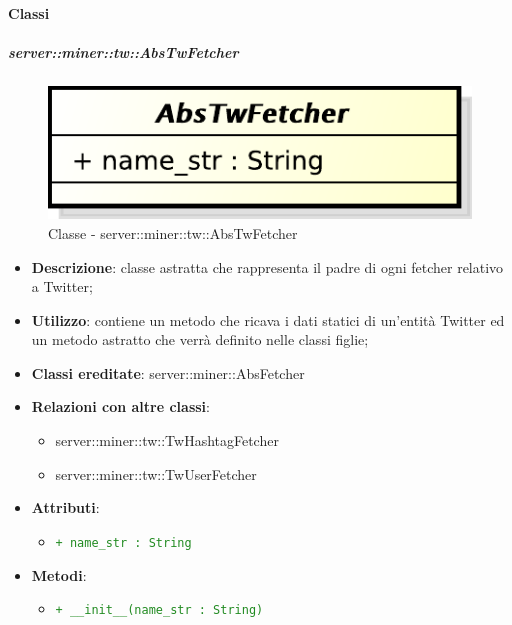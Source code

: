 	\paragraph{Classi} %
	\subparagraph{server::miner::tw::AbsTwFetcher} %
		\label{subp:server_miner_tw_AbsTwFetcher}
		    \begin{figure}[!htbp]
 		 		\centering
 				\centerline{\includegraphics[scale=0.75]{./images/server/classes/miner/abs_tw_fetcher.pdf}}
 				\caption{Classe - server::miner::tw::AbsTwFetcher}
			\end{figure}
			\begin{itemize}
				\item \textbf{Descrizione}: classe astratta che rappresenta il padre di ogni fetcher relativo a Twitter;
				\item \textbf{Utilizzo}: contiene un metodo che ricava i dati statici di un'entità Twitter ed un metodo astratto che verrà definito nelle classi figlie;
				\item \textbf{Classi ereditate}: server::miner::AbsFetcher
				\item \textbf{Relazioni con altre classi}:
					\begin{itemize}
						\item server::miner::tw::TwHashtagFetcher
						\item server::miner::tw::TwUserFetcher
					\end{itemize}
				\item \textbf{Attributi}:   
					\begin{itemize}
						\item \textcolor{forestgreen}{\texttt{+ name\_str : String}}
					\end{itemize}
				\item \textbf{Metodi}:  
					\begin{itemize}
						\item \textcolor{forestgreen}{\texttt{+ \_\_init\_\_(name\_str : String)}}
					\end{itemize}
			\end{itemize}

